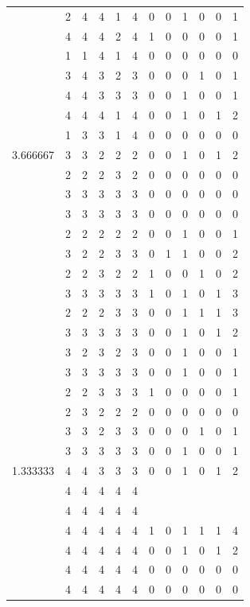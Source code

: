 \documentclass[]{book}
\theoremstyle{definition}
\theoremstyle{definition}
\theoremstyle{definition}
\theoremstyle{remark}
\begin{document}
\begin{table}
{\begin{tabular}[t]{rrrrrrrrrrrr}
 & 2 & 4 & 4 & 1 & 4 & 0 & 0 & 1 & 0 & 0 & 1\\
 & 4 & 4 & 4 & 2 & 4 & 1 & 0 & 0 & 0 & 0 & 1\\
 & 1 & 1 & 4 & 1 & 4 & 0 & 0 & 0 & 0 & 0 & 0\\
 & 3 & 4 & 3 & 2 & 3 & 0 & 0 & 0 & 1 & 0 & 1\\
 & 4 & 4 & 3 & 3 & 3 & 0 & 0 & 1 & 0 & 0 & 1\\
 & 4 & 4 & 4 & 1 & 4 & 0 & 0 & 1 & 0 & 1 & 2\\
 & 1 & 3 & 3 & 1 & 4 & 0 & 0 & 0 & 0 & 0 & 0\\
3.666667 & 3 & 3 & 2 & 2 & 2 & 0 & 0 & 1 & 0 & 1 & 2\\
 & 2 & 2 & 2 & 3 & 2 & 0 & 0 & 0 & 0 & 0 & 0\\
 & 3 & 3 & 3 & 3 & 3 & 0 & 0 & 0 & 0 & 0 & 0\\
 & 3 & 3 & 3 & 3 & 3 & 0 & 0 & 0 & 0 & 0 & 0\\
 & 2 & 2 & 2 & 2 & 2 & 0 & 0 & 1 & 0 & 0 & 1\\
 & 3 & 2 & 2 & 3 & 3 & 0 & 1 & 1 & 0 & 0 & 2\\
 & 2 & 2 & 3 & 2 & 2 & 1 & 0 & 0 & 1 & 0 & 2\\
 & 3 & 3 & 3 & 3 & 3 & 1 & 0 & 1 & 0 & 1 & 3\\
 & 2 & 2 & 2 & 3 & 3 & 0 & 0 & 1 & 1 & 1 & 3\\
 & 3 & 3 & 3 & 3 & 3 & 0 & 0 & 1 & 0 & 1 & 2\\
 & 3 & 2 & 3 & 2 & 3 & 0 & 0 & 1 & 0 & 0 & 1\\
 & 3 & 3 & 3 & 3 & 3 & 0 & 0 & 1 & 0 & 0 & 1\\
 & 2 & 2 & 3 & 3 & 3 & 1 & 0 & 0 & 0 & 0 & 1\\
 & 2 & 3 & 2 & 2 & 2 & 0 & 0 & 0 & 0 & 0 & 0\\
 & 3 & 3 & 2 & 3 & 3 & 0 & 0 & 0 & 1 & 0 & 1\\
 & 3 & 3 & 3 & 3 & 3 & 0 & 0 & 1 & 0 & 0 & 1\\
1.333333 & 4 & 4 & 3 & 3 & 3 & 0 & 0 & 1 & 0 & 1 & 2\\
 & 4 & 4 & 4 & 4 & 4 &  &  &  &  &  & \\
 & 4 & 4 & 4 & 4 & 4 &  &  &  &  &  & \\
 & 4 & 4 & 4 & 4 & 4 & 1 & 0 & 1 & 1 & 1 & 4\\
 & 4 & 4 & 4 & 4 & 4 & 0 & 0 & 1 & 0 & 1 & 2\\
 & 4 & 4 & 4 & 4 & 4 & 0 & 0 & 0 & 0 & 0 & 0\\
 & 4 & 4 & 4 & 4 & 4 & 0 & 0 & 0 & 0 & 0 & 0\\

\end{tabular}}
\end{table}
\end{document}
